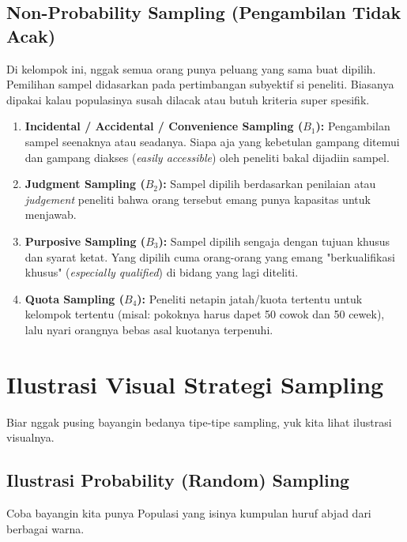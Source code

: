 \documentclass[12pt,a4paper]{article}
\begin{document}
\subsection{Non-Probability Sampling (Pengambilan Tidak Acak)}
Di kelompok ini, nggak semua orang punya peluang yang sama buat dipilih. Pemilihan sampel didasarkan pada pertimbangan subyektif si peneliti. Biasanya dipakai kalau populasinya susah dilacak atau butuh kriteria super spesifik.
\begin{enumerate}
    \item \textbf{Incidental / Accidental / Convenience Sampling ($B_1$):} Pengambilan sampel seenaknya atau seadanya. Siapa aja yang kebetulan gampang ditemui dan gampang diakses (\textit{easily accessible}) oleh peneliti bakal dijadiin sampel.
    \item \textbf{Judgment Sampling ($B_2$):} Sampel dipilih berdasarkan penilaian atau \textit{judgement} peneliti bahwa orang tersebut emang punya kapasitas untuk menjawab.
    \item \textbf{Purposive Sampling ($B_3$):} Sampel dipilih sengaja dengan tujuan khusus dan syarat ketat. Yang dipilih cuma orang-orang yang emang "berkualifikasi khusus" (\textit{especially qualified}) di bidang yang lagi diteliti.
    \item \textbf{Quota Sampling ($B_4$):} Peneliti netapin jatah/kuota tertentu untuk kelompok tertentu (misal: pokoknya harus dapet 50 cowok dan 50 cewek), lalu nyari orangnya bebas asal kuotanya terpenuhi.
\end{enumerate}

\newpage
\section{Ilustrasi Visual Strategi Sampling}

Biar nggak pusing bayangin bedanya tipe-tipe sampling, yuk kita lihat ilustrasi visualnya.

\subsection{Ilustrasi Probability (Random) Sampling}
Coba bayangin kita punya Populasi yang isinya kumpulan huruf abjad dari berbagai warna.
\end{document}
